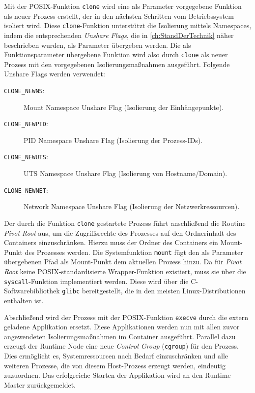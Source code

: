 Mit der \gls{POSIX}-Funktion \texttt{clone} wird eine als Parameter vorgegebene Funktion als neuer Prozess erstellt, der in den nächsten Schritten vom Betriebssystem isoliert wird. Diese \texttt{clone}-Funktion unterstützt die Isolierung mittels Namespaces, indem die entsprechenden \textit{Unshare Flags}, die in \autoref{ch:StandDerTechnik} näher beschrieben wurden, als Parameter übergeben werden. Die als Funktionsparameter übergebene Funktion wird also durch \texttt{clone} als neuer Prozess mit den vorgegebenen Isolierungsmaßnahmen ausgeführt. Folgende Unshare Flags werden verwendet:

\begin{description}
    \item[\texttt{CLONE\_NEWNS}:] Mount Namespace Unshare Flag (Isolierung der Einhängepunkte).
    \item[\texttt{CLONE\_NEWPID}:] PID Namespace Unshare Flag (Isolierung der Prozess-IDs).
    \item[\texttt{CLONE\_NEWUTS}:] UTS Namespace Unshare Flag (Isolierung von Hostname/Domain).
    \item[\texttt{CLONE\_NEWNET}:] Network Namespace Unshare Flag (Isolierung der Netzwerkressourcen).
\end{description}

Der durch die Funktion \texttt{clone} gestartete Prozess führt anschließend die Routine \textit{Pivot Root} aus, um die Zugriffsrechte des Prozesses auf den Ordnerinhalt des Containers einzuschränken. Hierzu muss der Ordner des Containers ein Mount-Punkt des Prozesses werden. Die Systemfunktion \texttt{mount} fügt den als Parameter übergebenen Pfad als Mount-Punkt dem aktuellen Prozess hinzu. Da für \textit{Pivot Root} keine \gls{POSIX}-standardisierte Wrapper-Funktion existiert, muss sie über die \texttt{syscall}-Funktion implementiert werden. Diese wird über die C-Softwarebibliothek \texttt{glibc} bereitgestellt, die in den meisten Linux-Distributionen enthalten ist. 

Abschließend wird der Prozess mit der \gls{POSIX}-Funktion \texttt{execve} durch die extern geladene Applikation ersetzt. Diese Applikationen werden nun mit allen zuvor angewendeten Isolierungsmaßnahmen im Container ausgeführt. Parallel dazu erzeugt der Runtime Node eine neue \textit{Control Group} (\texttt{cgroup}) für den Prozess. Dies ermöglicht es, Systemressourcen nach Bedarf einzuschränken und alle weiteren Prozesse, die von diesem Host-Prozess erzeugt werden, eindeutig zuzuordnen. Das erfolgreiche Starten der Applikation wird an den Runtime Master zurückgemeldet.

